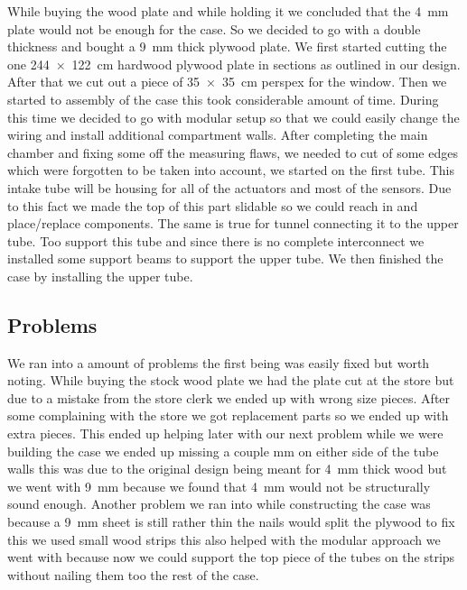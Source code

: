 \documentclass[a4paper,oneside]{book}
\begin{document}
While buying the wood plate and while holding it we concluded that the
\SI{4}{\mm} plate would not be enough for the case. So we decided to go with a
double thickness and bought a \SI{9}{\mm} thick plywood plate. We first started
cutting the one \SI{244x122}{\cm} hardwood plywood plate in sections as
outlined in our design. After that we cut out a piece of \SI{35x35}{\cm}
perspex for the window. Then we started to assembly of the case this took
considerable amount of time. During this time we decided to go with modular
setup so that we could easily change the wiring and install additional
compartment walls. After completing the main chamber and fixing some off the
measuring flaws, we needed to cut of some edges which were forgotten to be
taken into account, we started on the first tube. This intake tube will be
housing for all of the actuators and most of the sensors. Due to this fact we
made the top of this part slidable so we could reach in and place/replace
components. The same is true for tunnel connecting it to the upper tube. Too
support this tube and since there is no complete interconnect we installed some
support beams to support the upper tube. We then finished the case by
installing the upper tube.

\subsection{Problems}
We ran into a amount of problems the first being was easily fixed but worth
noting. While buying the stock wood plate we had the plate cut at the store but
due to a mistake from the store clerk we ended up with wrong size pieces.
After some complaining with the store we got replacement parts so we ended up
with extra pieces. This ended up helping later with our next problem while we
were building the case we ended up missing a couple mm on either side of the
tube walls this was due to the original design being meant for \SI{4}{\mm}
thick wood but we went with \SI{9}{\mm} because we found that \SI{4}{\mm} would
not be structurally sound enough. Another problem we ran into while
constructing the case was because a \SI{9}{\mm} sheet is still rather thin the
nails would split the plywood to fix this we used small wood strips this also
helped with the modular approach we went with because now we could support the
top piece of the tubes on the strips without nailing them too the rest of the
case.
\end{document}
